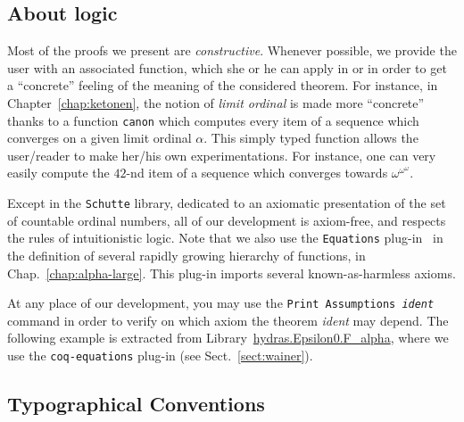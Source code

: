 \documentclass[twoside,a4paper]{book}
\newcounter{snippets}
\begin{document}
\subsection{About logic}

Most of the proofs we present are \emph{constructive}. Whenever possible, we provide the user with an associated function, which she or he can apply in \gallina{} or \ocaml{} in order to get a ``concrete'' feeling of the meaning of the considered theorem.
For instance, in Chapter~\vref{chap:ketonen}, the notion of \emph{limit ordinal} is
made more ``concrete'' thanks to a function \texttt{canon} which computes every item of a sequence which converges on a given limit ordinal $\alpha$. This simply typed function allows the user/reader to make her/his own experimentations.
For instance, one can very easily compute the $42$-nd item of a sequence which converges towards $\omega^{\omega^\omega}$.


 
Except in the \texttt{Schutte} library, dedicated to an axiomatic presentation of the set of countable ordinal numbers, all of our development is axiom-free, and respects the rules of intuitionistic logic. Note that we also use the \texttt{Equations} plug-in~\cite{sozeau:hal-01671777} in the definition of  several rapidly growing hierarchy of functions, in Chap.~\ref{chap:alpha-large}. This plug-in imports several known-as-harmless  axioms.



At any place of our development, you may use the  \texttt{Print Assumptions {\it ident}} command in order to verify on which axiom the theorem {\it ident} may depend. The following example is extracted from 
Library~\href{../theories/html/hydras.Epsilon0.F_alpha.html}{hydras.Epsilon0.F\_alpha}, where we use the \texttt{coq-equations} plug-in (see Sect.~\vref{sect:wainer}).




\subsection{Typographical Conventions}
\end{document}
